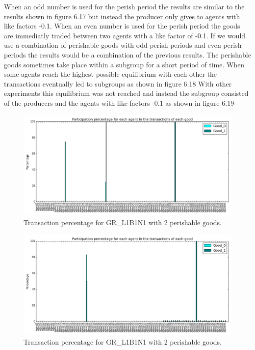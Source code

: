 \documentclass[twoside,openright]{uva-bachelor-thesis}
\begin{document}
\begin{description}
When an odd number is used for the perish period the results are similar to the results shown in figure 6.17 but instead the producer only gives to agents with like factors -0.1. When an even number is used for the perish period the goods are immediatly traded between two agents with a like factor of -0.1. If we would use a combination of perishable goods with odd perish periods and even perish periods the results would be a combination of the previous results. The perishable goods sometimes take place within a subgroup for a short period of time. When some agents reach the highest possible equilibrium with each other the transactions eventually led to subgroups as shown in figure 6.18 With other experiments this equilibrium was not reached and instead the subgroup consisted of the producers and the agents with like factors -0.1 as shown in figure 6.19 \\
\begin{figure}[h!]
  \centering
\includegraphics[scale=0.4]{Simulation_figures/GR_L1B1N1/2perishable_2233_100k}
  \caption{Transaction percentage for GR\_L1B1N1 with 2 perishable goods.}
\end{figure}
\begin{figure}[h!]
  \centering
    \includegraphics[scale=0.4]{Simulation_figures/GR_L1B1N1/2perishable_largercommunity}
  \caption{Transaction percentage for GR\_L1B1N1 with 2 perishable goods.}
\end{figure}


\end{description}
\end{document}

